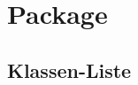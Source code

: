 
\chapter[Package ontologyFramework.OFErrorManagement.OFGUI]{Package }\label{ontologyFramework.OFErrorManagement.OFGUI-package}



\section{Klassen-Liste}
